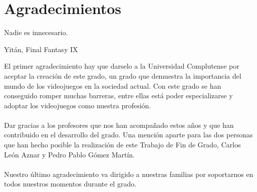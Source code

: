 %
%
%
%
%
%
%
%
%
%
%
%
%

\chapter{Agradecimientos}


\begin{FraseCelebre}
\begin{Frase}
Nadie es innecesario.
\end{Frase}
\begin{Fuente}
Yit\'an, Final Fantasy IX
\end{Fuente}
\end{FraseCelebre}

El primer agradecimiento hay que darselo a la Universidad Complutense por aceptar la creaci\'on de este grado, un grado que demuestra la importancia del mundo de los videojuegos en la sociedad actual. Con este grado se han conseguido romper muchas barreras, entre ellas est\'a poder especializarse y adoptar los videojuegos como nuestra profesi\'on.
\\
\\
Dar gracias a los profesores que nos han acompa\~nado estos a\~nos y que han contribuido en el desarrollo del grado. Una menci\'on aparte para las dos personas que han hecho posible la realizaci\'on de este Trabajo de Fin de Grado, Carlos Le\'on Aznar y Pedro Pablo G\'omez Mart\'in.
\\
\\
Nuestro \'ultimo  agradecimiento va dirigido a nuestras familias por soportarnos en todos nuestros momentos durante el grado.
\\

\endinput

